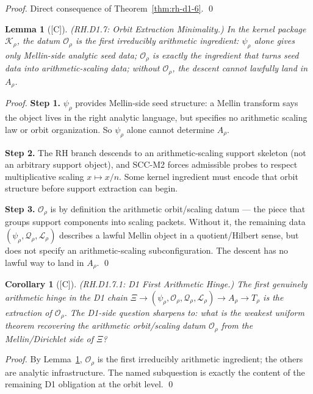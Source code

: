 \documentclass[12pt,oneside]{amsbook}
\theoremstyle{plain}
\newtheorem{lemma}[theorem]{Lemma}
\newtheorem{corollary}[theorem]{Corollary}
\theoremstyle{definition}
\theoremstyle{remark}
\newcommand{\status}[1]{\textup{[#1]}}
\begin{document}
\begin{proof}
Direct consequence of Theorem~\ref{thm:rh-d1-6}. \qed
\end{proof}

\begin{lemma}[\status{C}]\label{lem:rh-d1-7}
\textup{(RH.D1.7: Orbit Extraction Minimality.)}
In the kernel package $\mathcal{K}_\rho$, the datum
$\mathcal{O}_\rho$ is the first irreducibly arithmetic ingredient:
$\psi_\rho$ alone gives only Mellin-side analytic seed data;
$\mathcal{O}_\rho$ is exactly the ingredient that turns seed data
into arithmetic-scaling data; without $\mathcal{O}_\rho$, the
descent cannot lawfully land in $A_\rho$.
\end{lemma}

\begin{proof}
\textbf{Step 1.} $\psi_\rho$ provides Mellin-side seed structure:
a Mellin transform says the object lives in the right analytic
language, but specifies no arithmetic scaling law or orbit
organization. So $\psi_\rho$ alone cannot determine $A_\rho$.

\textbf{Step 2.} The RH branch descends to an arithmetic-scaling
support skeleton (not an arbitrary support object), and SCC-M2
forces admissible probes to respect multiplicative scaling
$x \mapsto x/n$. Some kernel ingredient must encode that orbit
structure before support extraction can begin.

\textbf{Step 3.} $\mathcal{O}_\rho$ is by definition the
arithmetic orbit/scaling datum --- the piece that groups support
components into scaling packets. Without it, the remaining data
$(\psi_\rho, \mathcal{Q}_\rho, \mathcal{L}_\rho)$ describes a
lawful Mellin object in a quotient/Hilbert sense, but does not
specify an arithmetic-scaling subconfiguration. The descent has no
lawful way to land in $A_\rho$. \qed
\end{proof}

\begin{corollary}[\status{C}]\label{cor:rh-d1-7-1}
\textup{(RH.D1.7.1: D1 First Arithmetic Hinge.)}
The first genuinely arithmetic hinge in the D1 chain
$\Xi \to (\psi_\rho, \mathcal{O}_\rho, \mathcal{Q}_\rho,
\mathcal{L}_\rho) \to A_\rho \to T_\rho$
is the extraction of $\mathcal{O}_\rho$. The D1-side question
sharpens to: what is the weakest uniform theorem recovering the
arithmetic orbit/scaling datum $\mathcal{O}_\rho$ from the
Mellin/Dirichlet side of $\Xi$?
\end{corollary}

\begin{proof}
By Lemma~\ref{lem:rh-d1-7}, $\mathcal{O}_\rho$ is the first
irreducibly arithmetic ingredient; the others are analytic
infrastructure. The named subquestion is exactly the content of
the remaining D1 obligation at the orbit level. \qed
\end{proof}
\end{document}
